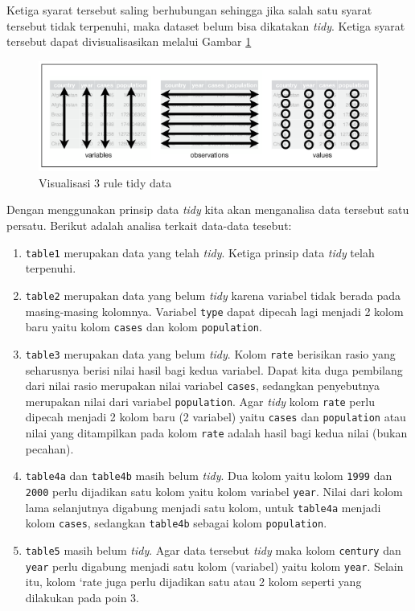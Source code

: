 \documentclass[]{book}
\providecommand{\tightlist}{%
  \setlength{\itemsep}{0pt}\setlength{\parskip}{0pt}}
\begin{document}
Ketiga syarat tersebut saling berhubungan sehingga jika salah satu
syarat tersebut tidak terpenuhi, maka dataset belum bisa dikatakan
\emph{tidy}. Ketiga syarat tersebut dapat divisualisasikan melalui
Gambar \ref{fig:tidy}

\begin{figure}

{\centering \includegraphics[width=8.14in]{tidy} 

}

\caption{Visualisasi 3 rule tidy data}\label{fig:tidy}
\end{figure}

Dengan menggunakan prinsip data \emph{tidy} kita akan menganalisa data
tersebut satu persatu. Berikut adalah analisa terkait data-data tesebut:

\begin{enumerate}
\def\labelenumi{\arabic{enumi}.}
\tightlist
\item
  \texttt{table1} merupakan data yang telah \emph{tidy}. Ketiga prinsip
  data \emph{tidy} telah terpenuhi.
\item
  \texttt{table2} merupakan data yang belum \emph{tidy} karena variabel
  tidak berada pada masing-masing kolomnya. Variabel \texttt{type} dapat
  dipecah lagi menjadi 2 kolom baru yaitu kolom \texttt{cases} dan kolom
  \texttt{population}.
\item
  \texttt{table3} merupakan data yang belum \emph{tidy}. Kolom
  \texttt{rate} berisikan rasio yang seharusnya berisi nilai hasil bagi
  kedua variabel. Dapat kita duga pembilang dari nilai rasio merupakan
  nilai variabel \texttt{cases}, sedangkan penyebutnya merupakan nilai
  dari variabel \texttt{population}. Agar \emph{tidy} kolom
  \texttt{rate} perlu dipecah menjadi 2 kolom baru (2 variabel) yaitu
  \texttt{cases} dan \texttt{population} atau nilai yang ditampilkan
  pada kolom \texttt{rate} adalah hasil bagi kedua nilai (bukan
  pecahan).
\item
  \texttt{table4a} dan \texttt{table4b} masih belum \emph{tidy}. Dua
  kolom yaitu kolom \texttt{1999} dan \texttt{2000} perlu dijadikan satu
  kolom yaitu kolom variabel \texttt{year}. Nilai dari kolom lama
  selanjutnya digabung menjadi satu kolom, untuk \texttt{table4a}
  menjadi kolom \texttt{cases}, sedangkan \texttt{table4b} sebagai kolom
  \texttt{population}.
\item
  \texttt{table5} masih belum \emph{tidy}. Agar data tersebut
  \emph{tidy} maka kolom \texttt{century} dan \texttt{year} perlu
  digabung menjadi satu kolom (variabel) yaitu kolom \texttt{year}.
  Selain itu, kolom `rate juga perlu dijadikan satu atau 2 kolom seperti
  yang dilakukan pada poin 3.
\end{enumerate}
\end{document}
